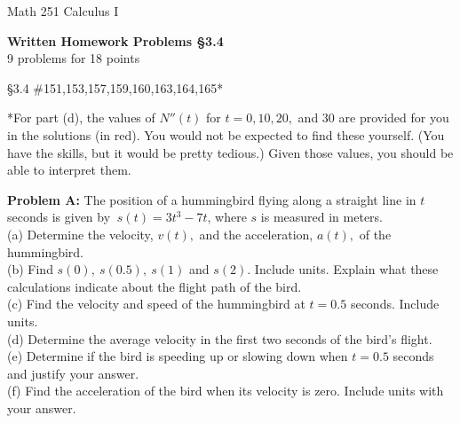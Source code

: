 \documentclass[11pt]{report}
\theoremstyle{plain}
\begin{document}
\hfill Math 251 Calculus I
\begin{center}
\Large{\textbf{Written Homework Problems \S 3.4}} \\
9 problems for 18 points\\
\end{center}

\begin{description}
\item{\S 3.4} \#151,153,157,159,160,163,164,165*

*For part (d), the values of $N''(t)$ for $t=0,10,20,$ and $30$ are provided for you in the solutions (in red). You would not be expected to find these yourself. (You have the skills, but it would be pretty tedious.) Given those values, you should be able to interpret them.\\

\item{\textbf{Problem A: }} The position of a hummingbird flying along a straight line in $t$ seconds is given by $~s(t)=3t^3-7t$, where $s$ is measured in meters.\\

(a) Determine the velocity, $v(t),$ and the acceleration, $a(t),$ of the hummingbird.\\

(b) Find $s(0), \: s(0.5),\: s(1)$ and $s(2).$ Include units. Explain what these calculations indicate about the flight path of the bird.\\

(c) Find the velocity and speed of the hummingbird at $t=0.5$ seconds. Include units.\\

(d) Determine the average velocity in the first two seconds of the bird's flight.\\

(e) Determine if the bird is speeding up or slowing down when $t=0.5$ seconds and justify your answer.\\

(f) Find the acceleration of the bird when its velocity is zero. Include units with your answer.

\end{description}
\end{document}
